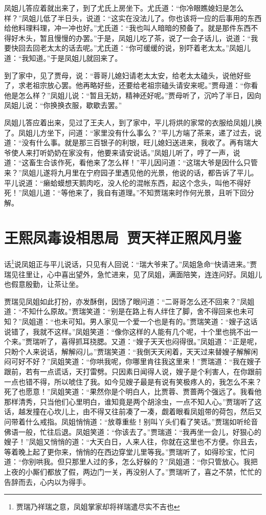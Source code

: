 \documentclass[12pt,oneside]{book}
\begin{document}
凤姐儿答应着就出来了，到了尤氏上房坐下。尤氏道：“你冷眼瞧媳妇是怎么样？”凤姐儿低了半日头，说道：“这实在没法儿了。你也该将一应的后事用的东西给他料理料理，冲一冲也好。”尤氏道：“我也叫人暗暗的预备了。就是那件东西不得好木头，暂且慢慢的办罢。”于是，凤姐儿吃了茶，说了一会子话儿，说道：“我要快回去回老太太的话去呢。”尤氏道：“你可缓缓的说，别吓着老太太。”凤姐儿道：“我知道。”于是凤姐儿就回来了。

到了家中，见了贾母，说：“蓉哥儿媳妇请老太太安，给老太太磕头，说他好些了，求老祖宗放心罢。他再略好些，还要给老祖宗磕头请安来呢。”贾母道：“你看他是怎么样？”凤姐儿说：“暂且无妨，精神还好呢。”贾母听了，沉吟了半日，因向凤姐儿说：“你换换衣服，歇歇去罢。”

凤姐儿答应着出来，见过了王夫人，到了家中，平儿将烘的家常的衣服给凤姐儿换了。凤姐儿方坐下，问道：“家里没有什么事么？”平儿方端了茶来，递了过去，说道：“没有什么事。就是那三百银子的利银，旺儿媳妇送进来，我收了。再有瑞大爷使人来打听奶奶在家没有，他要来请安说话。”凤姐儿听了，哼了一声，说道：“这畜生合该作死，看他来了怎么样！”平儿因问道：“这瑞大爷是因什么只管来？”凤姐儿遂将九月里在宁府园子里遇见他的光景，他说的话，都告诉了平儿。平儿说道：“癞蛤蟆想天鹅肉吃，没人伦的混帐东西，起这个念头，叫他不得好死！”凤姐儿道：“等他来了，我自有道理。”不知贾瑞来时作何光景，且听下回分解。

 
\chapter{王熙凤毒设相思局~贾天祥正照风月鉴}
话\footnote{贾瑞乃祥瑞之意，凤姐掌家却将祥瑞遣尽实不吉也}说凤姐正与平儿说话，只见有人回说：“瑞大爷来了。”凤姐急命“快请进来。”贾瑞见往里让，心中喜出望外，急忙进来，见了凤姐，满面陪笑，连连问好。凤姐儿也假意殷勤，让茶让坐。

贾瑞见凤姐如此打扮，亦发酥倒，因饧了眼问道：“二哥哥怎么还不回来？”凤姐道：“不知什么原故。”贾瑞笑道：“别是在路上有人绊住了脚，舍不得回来也未可知？”凤姐道：“也未可知。男人家见一个爱一个也是有的。”贾瑞笑道：“嫂子这话说错了，我就不这样。”凤姐笑道：“像你这样的人能有几个呢，十个里也挑不出一个来。”贾瑞听了，喜得抓耳挠腮。又道：“嫂子天天也闷得很。”凤姐道：“正是呢，只盼个人来说话，解解闷儿。”贾瑞笑道：“我倒天天闲着，天天过来替嫂子解解闲闷可好不好？”凤姐笑道：“你哄我呢，你哪里肯往我这里来！”贾瑞道：“我在嫂子跟前，若有一点谎话，天打雷劈。只因素日闻得人说，嫂子是个利害人，在你跟前一点也错不得，所以唬住了我。如今见嫂子最是有说有笑极疼人的，我怎么不来？死了也愿意！”凤姐笑道：“果然你是个明白人，比贾蓉、贾蔷两个强远了。我看他那样清秀，只当他们心里明白，谁知竟是两个胡涂虫，一点不知人心。”贾瑞听了这话，越发撞在心坎儿上，由不得又往前凑了一凑，觑着眼看凤姐带的荷包，然后又问带着什么戒指。凤姐悄悄道：“放尊重些！别叫丫头们看了笑话。”贾瑞如听纶音佛语一般，忙往后退。凤姐笑道：“你该去了。”贾瑞道：“我再坐一会儿，好狠心的嫂子！”凤姐又悄悄的道：“大天白日，人来人往，你就在这里也不方便。你且去，等着晚上起了更你来，悄悄的在西边穿堂儿里等我。”贾瑞听了，如得珍宝，忙问道：“你别哄我。但只那里人过的多，怎么好躲的？”凤姐道：“你只管放心。我把上夜的小厮们都放了假，两边门一关，再没别人了。”贾瑞听了，喜之不禁，忙忙的告辞而去，心内以为得手。
\end{document}
